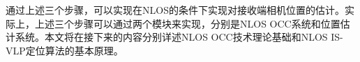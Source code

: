 通过上述三个步骤，可以实现在NLOS的条件下实现对接收端相机位置的估计。实际上，上述三个步骤可以通过两个模块来实现，分别是NLOS OCC系统和位置估计系统。本文将在接下来的内容分别详述NLOS OCC技术理论基础和NLOS IS-VLP定位算法的基本原理。


%


